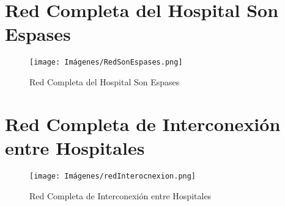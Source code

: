 \section{Red Completa del Hospital Son Espases}\label{anexo:redcompletasonespas}
\begin{figure}[H]
    \centering
    \texttt{[image: Imágenes/RedSonEspases.png]}
    \caption{Red Completa del Hospital Son Espases}
    \label{fig:SonEspases}
\end{figure}
\section{Red Completa de Interconexión entre Hospitales}\label{anexo:redcompletahosp}
\begin{figure}[H]
    \centering
    \texttt{[image: Imágenes/redInterocnexion.png]}
    \caption{Red Completa de Interconexión entre Hospitales}
    \label{fig:interconexion}
\end{figure}
